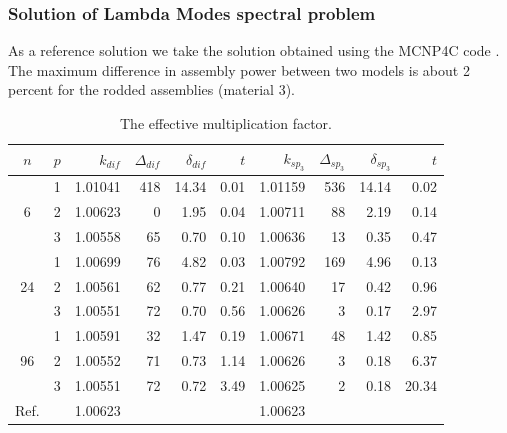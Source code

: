 \documentclass[a4paper]{jpconf}
\begin{document}
\subsubsection{Solution of Lambda Modes spectral problem}
As a reference solution we take the solution obtained using the MCNP4C code \cite{Bahabadi2016}. 
The maximum difference in assembly power between two models is about 2 percent for the rodded assemblies (material 3).
\begin{table}[htp]
\caption{The effective multiplication factor.}
\label{tab:iaea_with_lambda}
\begin{center}
\begin{tabular}{c c r r r r r r r r}
\hline
$n$ & $p$ & $k_{dif}$ & $\Delta_{dif}$ & $\delta_{dif}$ &$t$ &$k_{sp_3}$& $\Delta_{sp_3}$ & $\delta_{sp_3}$ &$t$ \\
\hline
	& 1	& 1.01041& 418&14.34& 0.01& 1.01159& 536& 14.14 &0.02\\
6	& 2	& 1.00623&   0& 1.95& 0.04& 1.00711&  88&  2.19 &0.14\\
	& 3	& 1.00558&  65& 0.70& 0.10& 1.00636&  13&  0.35 &0.47\\ 
\hline
	& 1	& 1.00699&  76& 4.82& 0.03& 1.00792& 169&  4.96 &0.13\\
24& 2	& 1.00561&  62& 0.77& 0.21& 1.00640&  17&  0.42 &0.96\\
	& 3	& 1.00551&  72& 0.70& 0.56& 1.00626&   3&  0.17 &2.97\\ 
\hline
	& 1	& 1.00591&  32& 1.47& 0.19& 1.00671&  48&  1.42 &0.85\\
96& 2	& 1.00552&  71& 0.73& 1.14& 1.00626&   3&  0.18 &6.37\\
	& 3	& 1.00551&  72& 0.72& 3.49& 1.00625&   2&  0.18 &20.34\\ 
\hline
Ref.&   & 1.00623&    &     &     & 1.00623&    &       &\\ 
\hline
\end{tabular}
\end{center}
\end{table}
\end{document}
